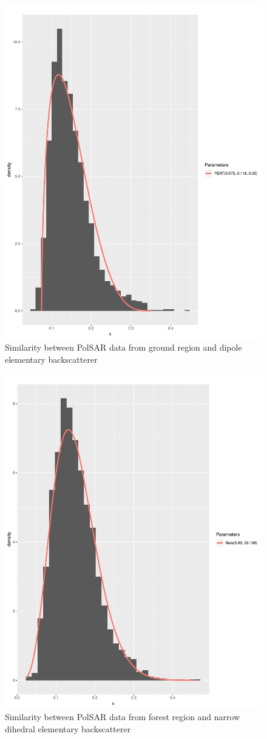 \documentclass[conference]{IEEEtran}
\begin{document}
\begin{figure}[!ht]
    \centering
    \includegraphics[width = .9\linewidth, height = .7\linewidth]{../../../Figures/paper_19_05/dip_ground.pdf}
    \caption{Similarity between PolSAR data from ground region and dipole elementary backscatterer}
    \label{fig:gr_dip}
\end{figure}

\begin{figure}[!ht]
    \centering
    \includegraphics[width = .9\linewidth, height = .7\linewidth]{../../../Figures/paper_19_05/nd_vegetation.pdf}
    \caption{Similarity between PolSAR data from forest region and narrow dihedral elementary backscatterer}
    \label{fig:fr_nd}
\end{figure}
\end{document}
